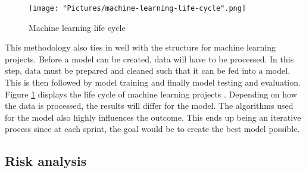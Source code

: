 \documentclass[11pt]{article}
\begin{document}
\begin{figure}[h!]
   \texttt{[image: "Pictures/machine-learning-life-cycle".png]}
   \caption{Machine learning life cycle}
   \label{fig:ml-life-cycle}
\end{figure}

This methodology also ties in well with the structure for machine learning projects. Before a model can be created, data will have to be processed. In this step, data must be prepared and cleaned such that it can be fed into a model. This is then followed by model training and finally model testing and evaluation. Figure \ref{fig:ml-life-cycle} displays the life cycle of machine learning projects \cite{methodology-ml-life-cycle}. Depending on how the data is processed, the results will differ for the model. The algorithms used for the model also highly influences the outcome. This ends up being an iterative process since at each sprint, the goal would be to create the best model possible. 

\subsection{Risk analysis}
\end{document}
